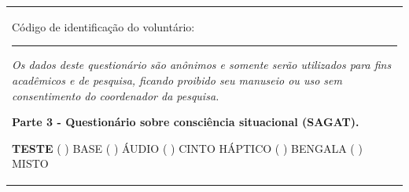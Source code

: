 \begin{table}[!htb]
    \centering
    \begin{tabular}{m{1\linewidth}}

        {\color{gray}
        
        Código de identificação do voluntário: \rule{1in}{.2mm}
        
        \textit{Os dados deste questionário são anônimos e somente serão utilizados para fins acadêmicos e de pesquisa, ficando proibido seu manuseio ou uso sem consentimento do coordenador da pesquisa.}
        }
        
        \begin{center}
        \textbf{Parte 3 - Questionário sobre consciência situacional (SAGAT).}
        \end{center}
        
        \noindent
        \textbf{TESTE} ( ) BASE \hfill ( ) ÁUDIO \hfill ( ) CINTO HÁPTICO \hfill ( ) BENGALA \hfill ( ) MISTO
        

\end{tabular}
\end{table}
